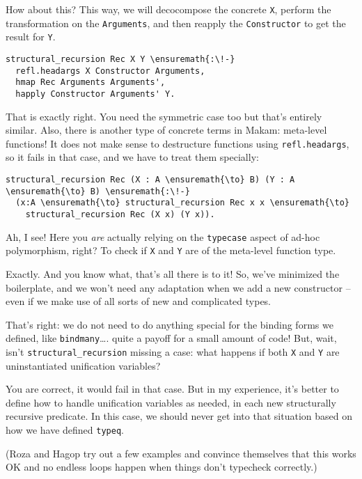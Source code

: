 \heroSTUDENT{} How about this? This way, we will decocompose the concrete
\texttt{X}, perform the transformation on the \texttt{Arguments}, and
then reapply the \texttt{Constructor} to get the result for \texttt{Y}.

\importantCodeblock{}

\begin{verbatim}
structural_recursion Rec X Y \ensuremath{:\!-}
  refl.headargs X Constructor Arguments,
  hmap Rec Arguments Arguments',
  happly Constructor Arguments' Y.
\end{verbatim}

\importantCodeblockEnd{}

\heroADVISOR{} That is exactly right. You need the symmetric case too but
that's entirely similar. Also, there is another type of concrete terms
in Makam: meta-level functions! It does not make sense to destructure
functions using \texttt{refl.headargs}, so it fails in that case, and we
have to treat them specially:

\importantCodeblock{}

\begin{verbatim}
structural_recursion Rec (X : A \ensuremath{\to} B) (Y : A \ensuremath{\to} B) \ensuremath{:\!-}
  (x:A \ensuremath{\to} structural_recursion Rec x x \ensuremath{\to}
    structural_recursion Rec (X x) (Y x)).
\end{verbatim}

\importantCodeblockEnd{}

\heroSTUDENT{} Ah, I see! Here you \emph{are} actually relying on the
\texttt{typecase} aspect of ad-hoc polymorphism, right? To check if
\texttt{X} and \texttt{Y} are of the meta-level function type.

\heroADVISOR{} Exactly. And you know what, that's all there is to it! So,
we've minimized the boilerplate, and we won't need any adaptation when
we add a new constructor -- even if we make use of all sorts of new and
complicated types.

\heroSTUDENT{} That's right: we do not need to do anything special for the
binding forms we defined, like \texttt{bindmany}\ldots{}. quite a payoff
for a small amount of code! But, wait, isn't
\texttt{structural\_recursion} missing a case: what happens if both
\texttt{X} and \texttt{Y} are uninstantiated unification variables?

\heroADVISOR{} You are correct, it would fail in that case. But in my
experience, it's better to define how to handle unification variables as
needed, in each new structurally recursive predicate. In this case, we
should never get into that situation based on how we have defined
\texttt{typeq}.

\begin{scenecomment}
(Roza and Hagop try out a few examples and convince themselves that this works OK and no endless loops happen when things don't typecheck correctly.)
\end{scenecomment}
